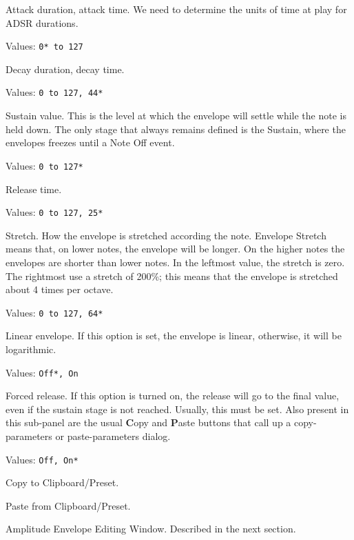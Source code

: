    \setcounter{ItemCounter}{0}      %

   Attack duration, attack time.
   We need to determine the units of time at play for ADSR durations.

   Values: \texttt{0* to 127}

   Decay duration, decay time.

   Values: \texttt{0 to 127, 44*}

   Sustain value.
   This is the level at which the envelope will settle while the note is held down.
   The only stage that always remains defined is the Sustain, where the
   envelopes freezes until a Note Off event.

   Values: \texttt{0 to 127*}

   Release time.

   Values: \texttt{0 to 127, 25*}

   Stretch.
   How the envelope is stretched according the note.
   Envelope Stretch means that, on lower notes, the envelope will be longer.
   On the higher notes the envelopes are shorter than lower notes. In the
   leftmost value, the stretch is zero. The rightmost use a stretch of 200\%;
   this means that the envelope is stretched about 4 times per octave.

   Values: \texttt{0 to 127, 64*}

   Linear envelope.
   If this option is set, the envelope is linear, otherwise, it will be
   logarithmic.

   Values: \texttt{Off*, On}

   Forced release.
   If this option is turned on, the release will go to the final value, even
   if the sustain stage is not reached. Usually, this must be set.
   Also present in this sub-panel are the usual \textbf{C}opy
   and \textbf{P}aste buttons that call up a copy-parameters or
   paste-parameters dialog.

   Values: \texttt{Off, On*}

   Copy to Clipboard/Preset.

   Paste from Clipboard/Preset.

   Amplitude Envelope Editing Window.
   Described in the next section.

